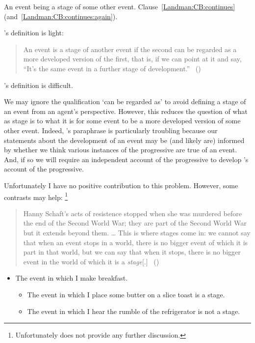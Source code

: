 \begin{note}
  An event being a stage of some other event.
  Clause~\ref{Landman:CB:continues} (and~\ref{Landman:CB:continues:again}).

  \citeauthor{Landman:1992wh}'s definition is light:
  \begin{quote}
    An event is a stage of another event if the second can be regarded as a more developed version of the first, that is, if we can point at it and say, ``It's the same event in a further stage of development.''\newline
    \mbox{ }\hfill\mbox{(\citeyear[23]{Landman:1992wh})}
  \end{quote}
  \citeauthor{Landman:1992wh}'s definition is difficult.

  We may ignore the qualification `can be regarded as' to avoid defining a stage of an event from an agent's perspective.
  However, this reduces the question of what as stage is to what it is for some event to be a more developed version of some other event.
  Indeed, \citeauthor{Landman:1992wh}'s paraphrase is particularly troubling because our statements about the development of an event may be (and likely are) informed by whether we think various instances of the progressive are true of an event.
  And, if so we will require an independent account of the progressive to develop \citeauthor{Landman:1992wh}'s account of the progressive.

  Unfortunately I have no positive contribution to this problem.
  However, some contrasts may help:%
  \footnote{
    Unfortunately \citeauthor{Landman:1992wh} does not provide any further discussion.
  }

  \begin{quote}
    Hanny Schaft's acts of resistence stopped when she was murdered before the end of the Second World War; they are part of the Second World War but it extends beyond them.
    \dots
    This is where stages come in: we cannot say that when an event stops in a world, there is no bigger event of which it is part in that world, but we can say that when it stops, there is no bigger event in the world of which it is a \emph{stage}[.]%
    \mbox{ }\hfill\mbox{(\citeyear[23]{Landman:1992wh})}
  \end{quote}

  \begin{itemize}
  \item
    The event in which I make breakfast.
    \begin{itemize}[noitemsep]
    \item
      The event in which I place some butter on a slice toast is a stage.
    \item
      The event in which I hear the rumble of the refrigerator is not a stage.
    \end{itemize}
  \end{itemize}


\end{note}
